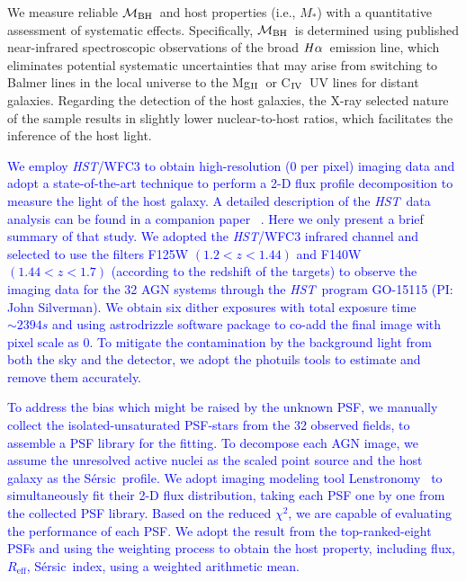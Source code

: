\documentclass[twocolumn,trackchanges]{aastex63}
\newcommand{\hst}{{\it HST}}
\newcommand{\mbh}{$\mathcal M_{\rm BH}$}
\newcommand{\mr}{$Mag_{\rm ~R}$}
\newcommand{\halpha}{${\it H}\alpha$}
\newcommand{\sersic}{S\'ersic}
\newcommand{\lenstronomy}{{\sc Lenstronomy}}
\newcommand{\reff}{{$R_{\mathrm{eff}}$}}
\newcommand{\mstar}{{$M_*$}}
\newcommand{\Mgii}{Mg$_{\rm II}$}
\newcommand{\Civ}{C$_{\rm IV}$}
\newcommand{\blue}[1]{{ \textcolor{blue}{#1}}}
\begin{document}
We measure reliable \mbh\ and host properties (i.e., \mstar) with a quantitative assessment of systematic effects. Specifically, \mbh\ is determined using published near-infrared spectroscopic observations of the broad \halpha\ emission line, which eliminates potential systematic uncertainties that may arise from switching to Balmer lines in the local universe to the \Mgii\ or \Civ\ UV lines for distant galaxies. Regarding the detection of the host galaxies, the X-ray selected nature of the sample results in slightly lower nuclear-to-host ratios, which facilitates the inference of the host light. 

\blue{We employ \hst/WFC3 to obtain high-resolution (0 per pixel) imaging data and adopt a state-of-the-art technique to perform a 2-D flux profile decomposition to measure the light of the host galaxy.
A detailed description of the \hst\ data analysis can be found in a companion paper ~\citep[][D19 hereafter]{Ding2019}. Here we only present a brief summary of that study. We adopted the \hst/WFC3 infrared channel and selected to use the filters F125W $(1.2<z<1.44)$ and F140W $(1.44<z<1.7)$ (according to the redshift of the targets) to observe the imaging data for the 32 AGN systems through the \hst\ program GO-15115 (PI: John Silverman). We obtain six dither exposures with total exposure time $\sim2394s$ and using  {\sc astrodrizzle} software package to co-add the final image with pixel scale as 0\farcs0642. To mitigate the contamination by the background light from both the sky and the detector, we adopt the {\sc photuils} tools to estimate and remove them accurately.}

\blue{To address the bias which might be raised by the unknown PSF, we manually collect the isolated-unsaturated PSF-stars from the 32 observed fields, to assemble a PSF library for the fitting. To decompose each AGN image, we assume the unresolved active nuclei as the scaled point source and the host galaxy as the \sersic\ profile. We adopt imaging modeling tool \lenstronomy~\citep{lenstronomy} to simultaneously fit their 2-D flux distribution, taking each PSF one by one from the collected PSF library. Based on the reduced $\chi^2$, we are capable of evaluating the performance of each PSF. We adopt the result from the top-ranked-eight PSFs and using the weighting process to obtain the host property, including flux, \reff, \sersic\ index, using a weighted arithmetic mean.}
\end{document}
